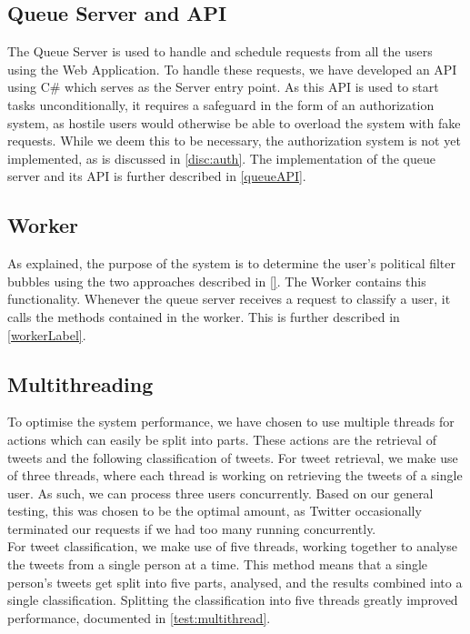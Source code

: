 \subsection{Queue Server and API}
The Queue Server is used to handle and schedule requests from all the users
using the Web Application. To handle these requests, we have developed an API
using C\# which serves as the Server entry point. As this API is used to start
tasks unconditionally, it requires a safeguard in the form of an authorization
system, as hostile users would otherwise be able to overload the system with
fake requests. While we deem this to be necessary, the authorization system is
not yet implemented, as is discussed in \autoref{disc:auth}. The implementation
of the queue server and its API is further described in \autoref{queueAPI}.

\subsection{Worker}
As explained, the purpose of the system is to determine the user's political
filter bubbles using the two approaches described in \autoref{}. The Worker
contains this functionality.
Whenever the queue server receives a request to classify a user, it calls the
methods contained in the worker. This is further described in
\autoref{workerLabel}.

\subsection{Multithreading}\label{subs:multithread}
To optimise the system performance, we have chosen to use multiple threads for
actions which can easily be split into parts. These actions are the retrieval of
tweets and the following classification of tweets. For tweet retrieval, we make
use of three threads, where each thread is working on retrieving the tweets of a
single user. As such, we can process three users concurrently. Based on our
general testing, this was chosen to be the optimal amount, as Twitter
occasionally terminated our requests if we had too many running concurrently.\\
For tweet classification, we make use of five threads, working together to
analyse the tweets from a single person at a time. This method means that a
single person's tweets get split into five parts, analysed, and the results
combined into a single classification. Splitting the classification into five
threads greatly improved performance, documented in \autoref{test:multithread}.

